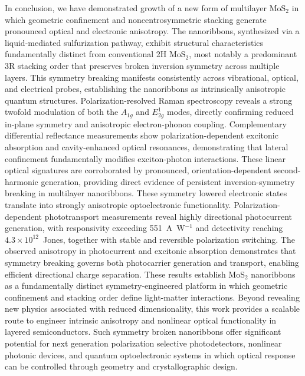\documentclass[journal=jacsnano,manuscript=article]{achemso}
\begin{document}
In conclusion, we have demonstrated growth of a new  form of multilayer MoS$_2$ in which geometric confinement and noncentrosymmetric stacking generate pronounced optical and electronic anisotropy. The nanoribbons, synthesized via a liquid-mediated sulfurization pathway, exhibit structural characteristics fundamentally distinct from conventional 2H  MoS$_2$, most notably a predominant 3R stacking order that preserves broken inversion symmetry across multiple layers. This symmetry breaking manifests consistently across vibrational, optical, and electrical probes, establishing the nanoribbons as intrinsically anisotropic quantum structures.
Polarization-resolved Raman spectroscopy reveals a strong twofold modulation of both the $A_{1g}$ and $E^1_{2g}$ modes, directly confirming reduced in-plane symmetry and anisotropic electron-phonon coupling. Complementary differential reflectance measurements show polarization-dependent excitonic absorption and cavity-enhanced optical resonances, demonstrating that lateral confinement fundamentally modifies exciton-photon interactions. These linear optical signatures are corroborated by pronounced, orientation-dependent second-harmonic generation, providing direct evidence of persistent inversion-symmetry breaking in multilayer nanoribbons. These symmetry lowered electronic states translate into strongly anisotropic optoelectronic functionality. Polarization-dependent phototransport measurements reveal highly directional photocurrent generation, with responsivity exceeding 551~A~W$^{-1}$ and detectivity reaching $4.3 \times 10^{12}$~Jones, together with stable and reversible polarization switching. The observed anisotropy in photocurrent and excitonic absorption demonstrates that symmetry breaking governs both photocarrier generation and transport, enabling efficient directional charge separation. These results establish  MoS$_2$ nanoribbons as a fundamentally distinct symmetry-engineered platform in which geometric confinement and stacking order define light-matter interactions. Beyond revealing new physics associated with reduced dimensionality, this work provides a scalable route to engineer intrinsic anisotropy and nonlinear optical functionality in layered semiconductors. Such symmetry broken nanoribbons offer significant potential for next generation polarization selective photodetectors, nonlinear photonic devices, and quantum optoelectronic systems in which optical response can be controlled through geometry and crystallographic design.


\end{document}
